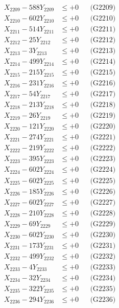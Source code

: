 \documentclass[a4paper,10pt]{article}
\begin{document}
{\begin{align}
X_{2209} - 588Y_{2209} &\leq +0 && \text{(G2209)} \\
X_{2210} - 602Y_{2210} &\leq +0 && \text{(G2210)} \\
\allowbreak
X_{2211} - 514Y_{2211} &\leq +0 && \text{(G2211)} \\
X_{2212} - 25Y_{2212} &\leq +0 && \text{(G2212)} \\
X_{2213} - 3Y_{2213} &\leq +0 && \text{(G2213)} \\
X_{2214} - 499Y_{2214} &\leq +0 && \text{(G2214)} \\
X_{2215} - 215Y_{2215} &\leq +0 && \text{(G2215)} \\
X_{2216} - 231Y_{2216} &\leq +0 && \text{(G2216)} \\
X_{2217} - 54Y_{2217} &\leq +0 && \text{(G2217)} \\
X_{2218} - 213Y_{2218} &\leq +0 && \text{(G2218)} \\
X_{2219} - 26Y_{2219} &\leq +0 && \text{(G2219)} \\
X_{2220} - 121Y_{2220} &\leq +0 && \text{(G2220)} \\
\allowbreak
X_{2221} - 274Y_{2221} &\leq +0 && \text{(G2221)} \\
X_{2222} - 219Y_{2222} &\leq +0 && \text{(G2222)} \\
X_{2223} - 395Y_{2223} &\leq +0 && \text{(G2223)} \\
X_{2224} - 602Y_{2224} &\leq +0 && \text{(G2224)} \\
X_{2225} - 602Y_{2225} &\leq +0 && \text{(G2225)} \\
X_{2226} - 185Y_{2226} &\leq +0 && \text{(G2226)} \\
X_{2227} - 602Y_{2227} &\leq +0 && \text{(G2227)} \\
X_{2228} - 210Y_{2228} &\leq +0 && \text{(G2228)} \\
X_{2229} - 69Y_{2229} &\leq +0 && \text{(G2229)} \\
X_{2230} - 602Y_{2230} &\leq +0 && \text{(G2230)} \\
\allowbreak
X_{2231} - 173Y_{2231} &\leq +0 && \text{(G2231)} \\
X_{2232} - 499Y_{2232} &\leq +0 && \text{(G2232)} \\
X_{2233} - 4Y_{2233} &\leq +0 && \text{(G2233)} \\
X_{2234} - 32Y_{2234} &\leq +0 && \text{(G2234)} \\
X_{2235} - 322Y_{2235} &\leq +0 && \text{(G2235)} \\
X_{2236} - 294Y_{2236} &\leq +0 && \text{(G2236)} \\

\end{align}}
\end{document}
